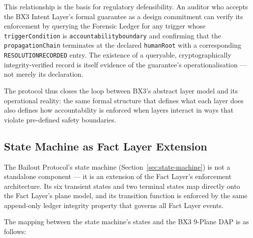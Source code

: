 This relationship is the basis for regulatory defensibility. An auditor who accepts the BX3 Intent Layer's formal guarantee as a design commitment can verify its enforcement by querying the Forensic Ledger for any trigger whose \texttt{triggerCondition} is \texttt{accountability\textunderscore boundary} and confirming that the \texttt{propagationChain} terminates at the declared \texttt{humanRoot} with a corresponding \texttt{RESOLUTION\textunderscore RECORDED} entry. The existence of a queryable, cryptographically integrity-verified record is itself evidence of the guarantee's operationalisation --- not merely its declaration.

The protocol thus closes the loop between BX3's abstract layer model and its operational reality: the same formal structure that defines what each layer does also defines how accountability is enforced when layers interact in ways that violate pre-defined safety boundaries.

\subsection{State Machine as Fact Layer Extension}
\label{sec:state-machine-fact-layer}

The Bailout Protocol's state machine (Section~\ref{sec:state-machine}) is not a standalone component --- it is an extension of the Fact Layer's enforcement architecture. Its six transient states and two terminal states map directly onto the Fact Layer's plane model, and its transition function is enforced by the same append-only ledger integrity property that governs all Fact Layer events.

The mapping between the state machine's states and the BX3 9-Plane DAP is as follows:

